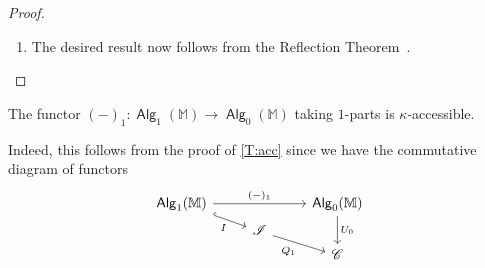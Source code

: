 \documentclass[sigconf,
			final%
			nonacm
                        ]{acmart}
\numberwithin{equation}{section}
\numberwithin{equation}{section}
\theoremstyle{plain}
\theoremstyle{definition}
\newcommand{\subto}{\hookrightarrow}
\newcommand{\inj}{\mathsf{in}}
\newcommand{\xra}[1]{\xrightarrow{~#1~}}
\newcommand{\M}{\mathbb{M}}                   %
\newcommand{\CatC}{\mathscr{C}}           %
\newcommand{\CatI}{\mathscr{I}}
\DeclareMathOperator{\Alg}{\mathsf{Alg}}
\begin{document}
\begin{proof}
\begin{enumerate}
    For $\kappa$-filtered colimits, given a $\kappa$-filtered diagram of
    $M_1$-algebras $A^j$ ($j \in J$), let $A$ be its colimit in $\CatI$
    with colimit injections $\inj^j\colon A^j \to A$. We show that $A$ is an
    $M_1$-algebra, that means that it satisfies homomorphy and
    coequalization. For the former, observe first that since $M_0M_1$
    is $\kappa$-accessible and colimits in $\CatI$ are formed
    componentwise we have a colimit cocone $M_0M_1\inj^j_0\colon A^j_0
    \to A_0$. Now consider the following diagram (again we put the
    index of $A^j$ in the subscript of structure morphisms)
    \[
      \begin{tikzcd}[row sep=15]
        M_0M_1A_0^j
        \ar{rrr}{\mu^{0,1}_{A_0^j}}
        \ar{ddd}[swap]{M_0a^{1,0}_j}
        \ar{rd}[inner sep = 0]{M_0M_1\inj^j_0}
        &&&
        M_1A^j_0
        \ar{ddd}{a^{1,0}_j}
        \ar{ld}[swap, inner sep = 1]{M_1\inj^j_0}
        \\
        &
        M_0M_1A_0
        \ar{r}{\mu^{0,1}_A}
        \ar{d}[swap]{M_0a^{1,0}}
        &
        M_1A
        \ar{d}{a^{1,0}}
        \\
        &
        M_1A_0
        \ar{r}{a^{1,0}}
        &
        A_1
        \\
        M_1A^j_0
        \ar{rrr}{a^{1,0}_j}
        \ar{ru}[inner sep = 1]{M_1\inj^j_0}
        &&&
        A_1^j
        \ar{lu}[swap, inner sep = 0]{\inj^j_1}
      \end{tikzcd}
    \]
    The outside commutes since $A^j$ is an $M_1$-algebra, and the four
    inner trapezoids commute due to the naturality of $\mu^{0,1}$ and
    the fact that $\inj^j$ is a morphism in $\CatI$. Thus, the desired
    inner square commutes when precomposed by every colimit injection
    $M_0M_1\inj^j_0$, whence it commutes as desired. That $A$
    satisfies coequalization is shown analogously

  \item The desired result now follows from the Reflection Theorem~\cite[Thm.~2.48]{AR94}.
    \qedhere
  \end{enumerate}
\end{proof}
%
\begin{corollary}
  The functor $(-)_1\colon \Alg_1(\M) \to \Alg_0(\M)$ taking $1$-parts
  is $\kappa$-accessible.
\end{corollary}
%
\noindent
Indeed, this follows from the proof of \cref{T:acc} since we have
the commutative diagram of functors
\[
  \begin{tikzcd}[row sep = 3]
    \Alg_1(\M) \ar{rr}{(-)_1}
    \ar[hook]{rd}[swap]{I}
    &&
    \Alg_0(\M)
    \ar{dd}{U_0}
    \\
    &
    \CatI
    \ar{rd}[swap]{Q_1}
    \\
    &&
    \CatC
  \end{tikzcd}
\]
\end{document}
